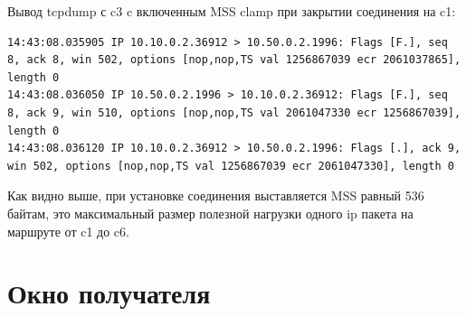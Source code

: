 \documentclass[a4paper,12pt]{article}
\begin{document}
Вывод tcpdump с c3 c включенным MSS clamp при закрытии соединения на c1:
\begin{Verbatim}
14:43:08.035905 IP 10.10.0.2.36912 > 10.50.0.2.1996: Flags [F.], seq 8, ack 8, win 502, options [nop,nop,TS val 1256867039 ecr 2061037865], length 0
14:43:08.036050 IP 10.50.0.2.1996 > 10.10.0.2.36912: Flags [F.], seq 8, ack 9, win 510, options [nop,nop,TS val 2061047330 ecr 1256867039], length 0
14:43:08.036120 IP 10.10.0.2.36912 > 10.50.0.2.1996: Flags [.], ack 9, win 502, options [nop,nop,TS val 1256867039 ecr 2061047330], length 0
\end{Verbatim}

Как видно выше, при установке соединения выставляется MSS равный 536 байтам, это максимальный размер полезной нагрузки одного ip пакета на маршруте от c1 до c6.

\section{Окно получателя}
\end{document}
